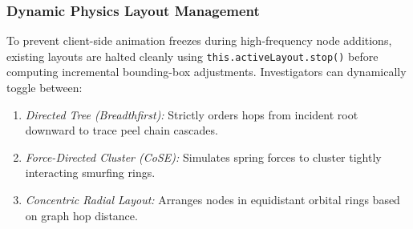 \subsubsection{Dynamic Physics Layout Management}
To prevent client-side animation freezes during high-frequency node additions, existing layouts are halted cleanly using \texttt{this.activeLayout.stop()} before computing incremental bounding-box adjustments. Investigators can dynamically toggle between:
\begin{enumerate}
    \item \emph{Directed Tree (Breadthfirst):} Strictly orders hops from incident root downward to trace peel chain cascades.
    \item \emph{Force-Directed Cluster (CoSE):} Simulates spring forces to cluster tightly interacting smurfing rings.
    \item \emph{Concentric Radial Layout:} Arranges nodes in equidistant orbital rings based on graph hop distance.
\end{enumerate}
